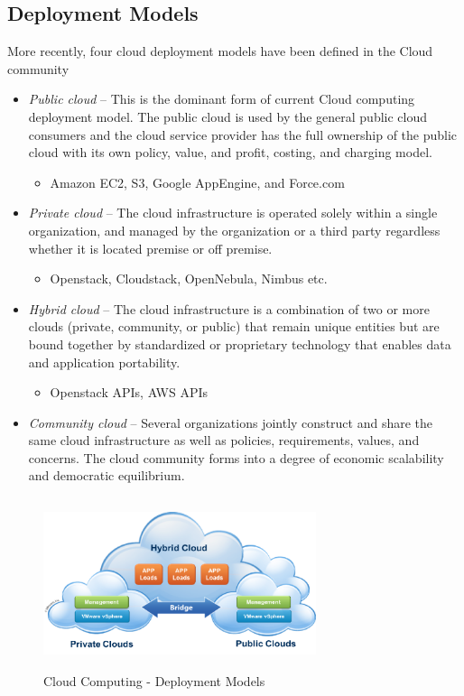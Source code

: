 \documentclass[12pt]{report}
\begin{document}
\subsection{Deployment Models}

More recently, four cloud deployment models have been defined in the Cloud community

\begin{itemize}
\item \textit{Public cloud} -- This is the dominant form of current Cloud computing deployment model. The public cloud is used by the general public cloud consumers and the cloud service provider has the full ownership of the public cloud with its own policy, value, and profit, costing, and charging model.
\begin{itemize}
	\item   Amazon EC2, S3, Google AppEngine, and Force.com
\end{itemize}

\item\textit{ Private cloud }-- The cloud infrastructure is operated solely within a single organization, and managed by the organization or a third party regardless whether it is located premise or off premise.
\begin{itemize}
	\item   Openstack, Cloudstack, OpenNebula, Nimbus etc.
\end{itemize}
\item \textit{Hybrid cloud }-- The cloud infrastructure is a combination of two or more clouds (private, community, or public) that remain unique entities but are bound together by standardized or proprietary technology that enables data and application portability.
\begin{itemize}
	\item   Openstack APIs, AWS APIs
\end{itemize}
\item \textit{Community cloud} -- Several organizations jointly construct and share the same cloud infrastructure as well as policies, requirements, values, and concerns. The cloud community forms into a degree of economic scalability and democratic equilibrium.
\end{itemize}

\begin{figure}[H]
 \centering
 \includegraphics[width=8cm,height=5cm]{./model.png}
 \caption{Cloud Computing - Deployment Models \label{fig:model} }
\end{figure}
\end{document}
